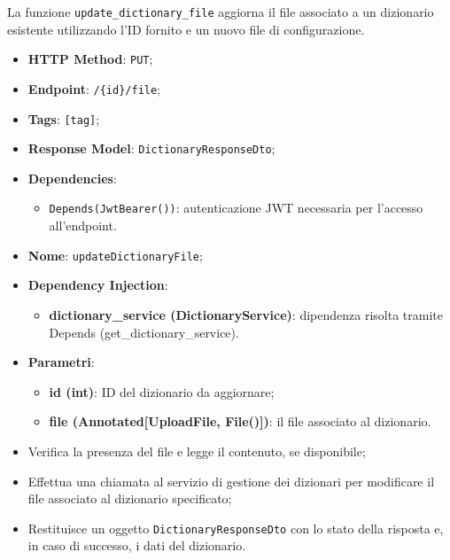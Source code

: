 \par La funzione \texttt{update\_dictionary\_file} aggiorna il file associato a un dizionario esistente utilizzando l'ID fornito e un nuovo file di configurazione.

\begin{itemize}
  \item \textbf{HTTP Method}: \texttt{PUT};
  \item \textbf{Endpoint}: \texttt{/\{id\}/file};
  \item \textbf{Tags}: \texttt{[tag]};
  \item \textbf{Response Model}: \texttt{DictionaryResponseDto};
  \item \textbf{Dependencies}:
  \begin{itemize}
    \item \texttt{Depends(JwtBearer())}: autenticazione JWT necessaria per l'accesso all'endpoint.
  \end{itemize}
  \item \textbf{Nome}: \texttt{updateDictionaryFile};
  \item \textbf{Dependency Injection}:
  \begin{itemize}
    \item \textbf{dictionary\_service (DictionaryService)}: dipendenza risolta tramite Depends (get\_dictionary\_service).
  \end{itemize}
  \item \textbf{Parametri}:
  \begin{itemize}
    \item \textbf{id (int)}: ID del dizionario da aggiornare;
    \item \textbf{file (Annotated[UploadFile, File()])}: il file associato al dizionario.
  \end{itemize}
\end{itemize}

\begin{itemize}
  \item Verifica la presenza del file e legge il contenuto, se disponibile;
  \item Effettua una chiamata al servizio di gestione dei dizionari per modificare il file associato al dizionario specificato;
  \item Restituisce un oggetto \texttt{DictionaryResponseDto} con lo stato della risposta e, in caso di successo, i dati del dizionario.
\end{itemize}

